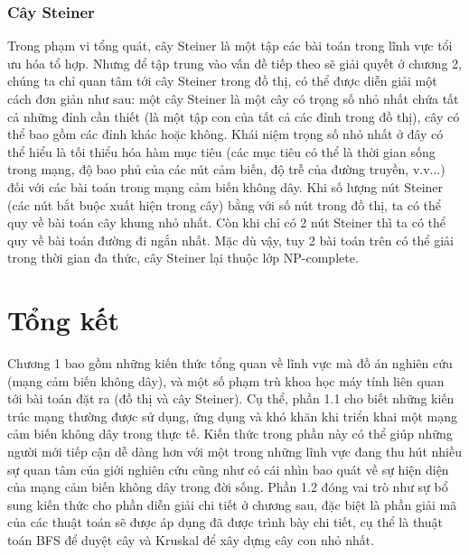 \subsubsection{Cây Steiner}
Trong phạm vi tổng quát, cây Steiner là một tập các bài toán trong lĩnh vực tổi ưu hóa tổ hợp. Nhưng để tập trung vào vấn đề tiếp theo sẽ giải quyết ở chương 2, chúng ta chỉ quan tâm tới cây Steiner trong đồ thị, có thể được diễn giải một cách đơn giản như sau: một cây Steiner là một cây có trọng số nhỏ nhất chứa tất cả những đỉnh cần thiết (là một tập con của tất cả các đỉnh trong đồ thị), cây có thể bao gồm các đỉnh khác hoặc không. Khái niệm trọng số nhỏ nhất ở đây có thể hiểu là tối thiểu hóa hàm mục tiêu (các mục tiêu có thể là thời gian sống trong mạng, độ bao phủ của các nút cảm biến, độ trễ của đường truyền, v.v...) đối với các bài toán trong mạng cảm biến không dây. Khi số lượng nút Steiner (các nút bắt buộc xuất hiện trong cây) bằng với số nút trong đồ thị, ta có thể quy về bài toán cây khung nhỏ nhất. Còn khi chỉ có 2 nút Steiner thì ta có thể quy về bài toán đường đi ngắn nhất. Mặc dù vậy, tuy 2 bài toán trên có thể giải trong thời gian đa thức, cây Steiner lại thuộc lớp NP-complete.\cite{karp1972reducibility}

\section{Tổng kết}
Chương 1 bao gồm những kiến thức tổng quan về lĩnh vực mà đồ án nghiên cứu (mạng cảm biến không dây), và một số phạm trù khoa học máy tính liên quan tới bài toán đặt ra (đồ thị và cây Steiner). Cụ thể, phần 1.1 cho biết những kiến trúc mạng thường được sử dụng, ứng dụng và khó khăn khi triển khai một mạng cảm biến không dây trong thực tế. Kiến thức trong phần này có thể giúp những người mới tiếp cận dễ dàng hơn với một trong những lĩnh vực đang thu hút nhiều sự quan tâm của giới nghiên cứu cũng như có cái nhìn bao quát về sự hiện diện của mạng cảm biến không dây trong đời sống. Phần 1.2 đóng vai trò như sự bổ sung kiến thức cho phần diễn giải chi tiết ở chương sau, đặc biệt là phần giải mã của các thuật toán sẽ được áp dụng đã được trình bày chi tiết, cụ thể là thuật toán BFS để duyệt cây và Kruskal để xây dựng cây con nhỏ nhất.